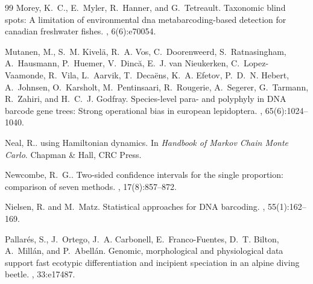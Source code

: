 \documentclass[12pt]{article}
\begin{document}
\begin{thebibliography}{99}
Morey, K.~C., E.~Myler, R.~Hanner, and
  G.~Tetreault\leavevmode\nopagebreak{}.
\newblock Taxonomic blind spots: A limitation of environmental dna
  metabarcoding-based detection for canadian freshwater fishes.
, 6(6):e70054.

Mutanen, M., S.~M. Kivelä, R.~A. Vos, C.~Doorenweerd, S.~Ratnasingham,
  A.~Hausmann, P.~Huemer, V.~Dincă, E.~J. van Nieukerken, C.~Lopez-Vaamonde,
  R.~Vila, L.~Aarvik, T.~Decaëns, K.~A. Efetov, P.~D.~N. Hebert, A.~Johnsen,
  O.~Karsholt, M.~Pentinsaari, R.~Rougerie, A.~Segerer, G.~Tarmann, R.~Zahiri,
  and H.~C.~J. Godfray\leavevmode\nopagebreak{}.
\newblock Species-level para- and polyphyly in {DNA} barcode gene trees: Strong
  operational bias in european lepidoptera.
, 65(6):1024--1040.

Neal, R.\leavevmode\nopagebreak{}.
 using {H}amiltonian dynamics.
\newblock In {\em Handbook of Markov Chain Monte Carlo}. Chapman \& Hall, CRC
  Press.

Newcombe, R.~G.\leavevmode\nopagebreak{}.
\newblock Two-sided confidence intervals for the single proportion: comparison
  of seven methods.
, 17(8):857--872.

Nielsen, R. and M.~Matz\leavevmode\nopagebreak{}.
\newblock Statistical approaches for {DNA} barcoding.
, 55(1):162--169.


Pallarés, S., J.~Ortego, J.~A. Carbonell, E.~Franco-Fuentes, D.~T. Bilton, A.~Millán, and P.~Abellán\leavevmode\nopagebreak{}.
\newblock Genomic, morphological and physiological data support fast ecotypic differentiation and incipient speciation in an alpine diving beetle.
, 33:e17487.




\end{thebibliography}
\end{document}

